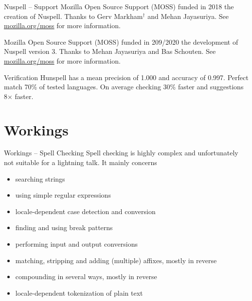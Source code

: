 \documentclass{beamer}
\begin{document}
\begin{frame}{Nuspell – Support}
Mozilla Open Source Support (MOSS) funded in 2018 the creation of Nuspell. Thanks to Gerv Markham$^†$ and Mehan Jayasuriya. See \href{https://mozilla.org/moss}{mozilla.org/moss} for more information.

Mozilla Open Source Support (MOSS) funded in 209/2020 the development of Nuspell version 3. Thanks to Mehan Jayasuriya and Bas Schouten. See \href{https://mozilla.org/moss}{mozilla.org/moss} for more information.


\begin{figure}
\centering
\def\svgwidth{.75\columnwidth}

\end{figure}
Verification Hunspell has a mean precision of 1.000 and accuracy of 0.997. Perfect match 70\% of tested languages. On average checking 30\% faster and suggestions 8× faster.
\end{frame}



\section{Workings}

\begin{frame}{Workings – Spell Checking}
Spell checking is \alert{highly complex} and unfortunately not suitable for a lightning talk. It mainly concerns
\begin{itemize}
\item searching strings
\item using simple regular expressions
\item locale-dependent case detection and conversion
\item finding and using break patterns
\item performing input and output conversions
\item matching, stripping and adding (multiple) affixes, mostly in reverse
\item compounding in several ways, mostly in reverse
\item locale-dependent tokenization of plain text
\end{itemize}
\end{frame}
\end{document}
